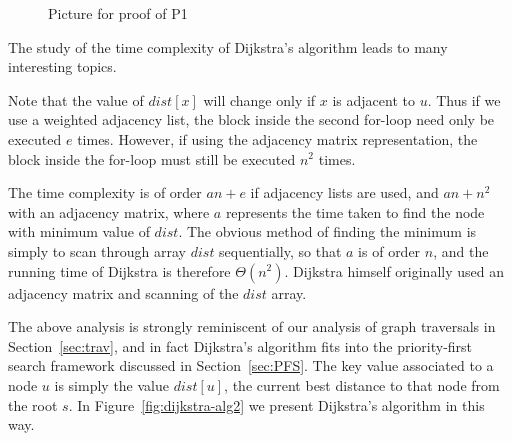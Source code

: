 \begin{figure}

\caption{Picture for proof of P1}
\label{fig:dijk-proof2}
\end{figure}


The study of the time complexity of Dijkstra's algorithm leads to many
interesting topics.

Note that the value of $dist[x]$ will change only if $x$ is adjacent to
$u$. Thus if we use a weighted adjacency list, the block inside the
second for-loop need only be executed  $e$ times. However, if
using the adjacency matrix representation, the block inside the for-loop
must still be executed $n^2$ times.

The time complexity is of order $a n + e$ if adjacency lists are used,
and $a n + n^2$ with an adjacency matrix, where $a$ represents the time
taken to find the node with minimum value of $dist$. The obvious method
of finding the minimum is simply to scan through array $dist$
sequentially, so that $a$ is of order $n$, and the running time of
Dijkstra is therefore $\Theta(n^2)$. Dijkstra himself originally used
an adjacency matrix and scanning of the $dist$ array. 

The above analysis is strongly reminiscent of our analysis of graph
traversals in Section~\ref{sec:trav}, and in fact Dijkstra's algorithm fits
into the priority-first search framework discussed in
Section~\ref{sec:PFS}. The key value associated to a node $u$ is simply the
value $dist[u]$, the current best distance to that node from the root $s$.
In Figure~\ref{fig:dijkstra-alg2} we present Dijkstra's algorithm in this
way.


